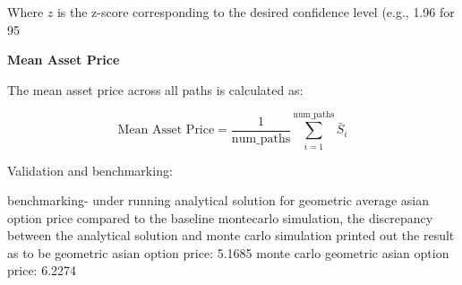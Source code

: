 \documentclass{article}
\begin{document}
Where \( z \) is the z-score corresponding to the desired confidence level (e.g., 1.96 for 95%

\textbf{Mean Asset Price}

The mean asset price across all paths is calculated as:

\[
\text{Mean Asset Price} = \frac{1}{\text{num\_paths}} \sum_{i=1}^{\text{num\_paths}} \bar{S}_i
\]

Validation and benchmarking:

benchmarking- under running analytical solution for geometric average asian option price compared to the baseline montecarlo simulation, 
the discrepancy between the analytical solution and monte carlo simulation printed out the result as to be 
geometric asian option price: 5.1685
monte carlo geometric asian option price: 6.2274
\end{document}
